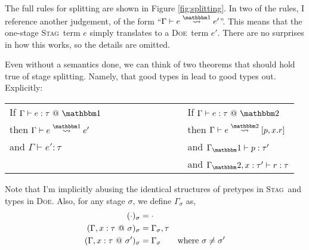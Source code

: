 \documentclass[11pt]{article}
\makeatletter
\newcommand {\bbone} {\mathbbm 1}
\newcommand {\bbtwo} {\mathbbm 2}
\newcommand {\at} {{\tt~@~}}
\newcommand {\translates} {\overset{\bbone}\rightsquigarrow}
\newcommand {\splits} {\overset{\bbtwo}\rightsquigarrow}
\newcommand {\wstage} {\textsc{Stag}}
\newcommand {\wostage} {\textsc{Doe}}
\makeatother
\begin{document}
The full rules for splitting are shown in Figure \ref{fig:splitting}.  In two of the rules, I reference another judgement, of the form ``$\Gamma \vdash e \translates e'$''.  This means that the one-stage \wstage~term $e$ simply translates to a \wostage~term $e'$.  There are no surprises in how this works, so the details are omitted.

Even without a semantics done, we can think of two theorems that should hold true of stage splitting.  Namely, that good types in lead to good types out.  Explicitly:

\begin{center}
\begin{tabular}{lll}
If $\Gamma \vdash e:\tau \at \bbone$ &~~~~~~~~~~~~~~ & If $\Gamma \vdash e:\tau \at \bbtwo$ \\
then $\Gamma \vdash e \translates e'$ && then $\Gamma \vdash e \splits [p,x.r]$ \\
and $\Gamma \vdash e':\tau$ && and $\Gamma_\bbone \vdash p:\tau'$\\
 && and $\Gamma_\bbtwo, x:\tau' \vdash r:\tau$
\end{tabular}
\end{center}
Note that I'm implicitly abusing the identical structures of pretypes in \wstage~and types in \wostage.  Also, for any stage $\sigma$, we define $\Gamma_\sigma$ as,
\begin{align}
(\cdot)_\sigma &= \cdot \\
(\Gamma,x:\tau\at\sigma)_\sigma &= \Gamma_\sigma, \tau \\
(\Gamma,x:\tau\at\sigma')_\sigma &= \Gamma_\sigma &\text{where } \sigma \not= \sigma'
\end{align}
\end{document}
